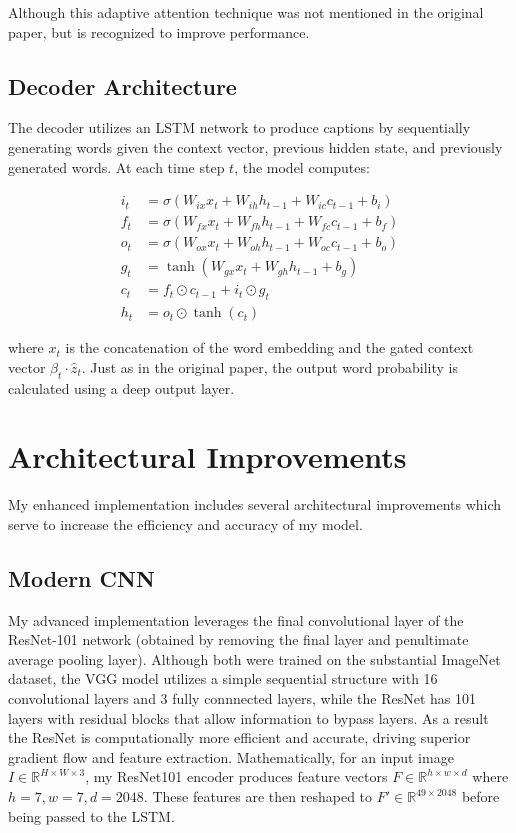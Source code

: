 \documentclass{article}
\theoremstyle{plain}
\theoremstyle{definition}
\theoremstyle{remark}
\begin{document}
Although this adaptive attention technique was not mentioned in the original paper, but is recognized to improve performance.

\subsection{Decoder Architecture}

The decoder utilizes an LSTM network to produce captions by sequentially generating words given the context vector, previous hidden state, and previously generated words. At each time step $t$, the model computes:

\begin{align}
i_t &= \sigma(W_{ix} x_t + W_{ih} h_{t-1} + W_{ic} c_{t-1} + b_i) \\
f_t &= \sigma(W_{fx} x_t + W_{fh} h_{t-1} + W_{fc} c_{t-1} + b_f) \\
o_t &= \sigma(W_{ox} x_t + W_{oh} h_{t-1} + W_{oc} c_{t-1} + b_o) \\
g_t &= \tanh(W_{gx} x_t + W_{gh} h_{t-1} + b_g) \\
c_t &= f_t \odot c_{t-1} + i_t \odot g_t \\
h_t &= o_t \odot \tanh(c_t)
\end{align}

where $x_t$ is the concatenation of the word embedding and the gated context vector $\beta_t \cdot \hat{z}_t$. Just as in the original paper, the output word probability is calculated using a deep output layer.

\section{Architectural Improvements}

My enhanced implementation includes several architectural improvements which serve to increase the efficiency and accuracy of my model.
    
\subsection{Modern CNN} My advanced implementation leverages the final convolutional layer of the ResNet-101 network (obtained by removing the final layer and penultimate average pooling layer). Although both were trained on the substantial ImageNet dataset, the VGG model utilizes a simple sequential structure with 16 convolutional layers and 3 fully connnected layers, while the ResNet has 101 layers with residual blocks that allow information to bypass layers. As a result the ResNet is computationally more efficient and accurate, driving superior gradient flow and feature extraction. Mathematically, for an input image $I \in \mathbb{R}^{H \times W \times 3}$, my ResNet101 encoder produces feature vectors $F \in \mathbb{R}^{h \times w \times d}$ where $h=7, w=7, d=2048$. These features are then reshaped to $F' \in \mathbb{R}^{49 \times 2048}$ before being passed to the LSTM.
\end{document}
